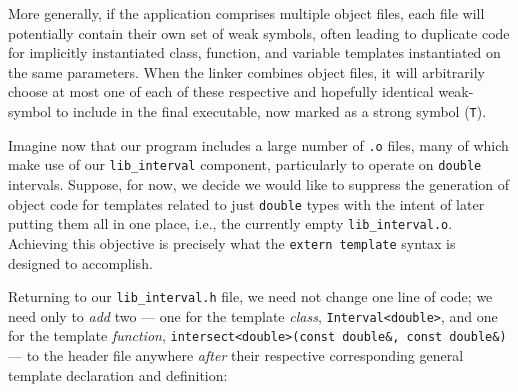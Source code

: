 More generally, if the application comprises multiple object files, each
file will potentially contain their own set of weak symbols,
often leading to duplicate code  for implicitly
instantiated class, function, and variable
templates instantiated on the same parameters. When the linker combines
object files, it will arbitrarily choose at most one of each of these
respective and hopefully identical weak-symbol  to
include in the final executable, now marked as a strong symbol
(\lstinline!T!).

Imagine now that our program includes a large number of \lstinline!.o!
files, many of which make use of our \lstinline!lib_interval! component,
particularly to operate on \lstinline!double! intervals. Suppose, for now,
we decide we would like to suppress the generation of object code for
templates related to just \lstinline!double! types with the intent of later putting them all in one place, i.e., the currently
empty \lstinline!lib_interval.o!. Achieving this objective is precisely what the
\lstinline!extern!~\lstinline!template! syntax is designed to accomplish.

Returning to our \lstinline!lib_interval.h! file, we need not change one
line of code; we need only to \emph{add} two
 --- one for the
template \emph{class}, \lstinline!Interval<double>!, and one for the
template \emph{function},
\lstinline!intersect<double>(const!~\lstinline!double&,!~\lstinline!const!~\lstinline!double&)!
--- to the header file anywhere \emph{after} their respective
corresponding general template declaration and definition:

